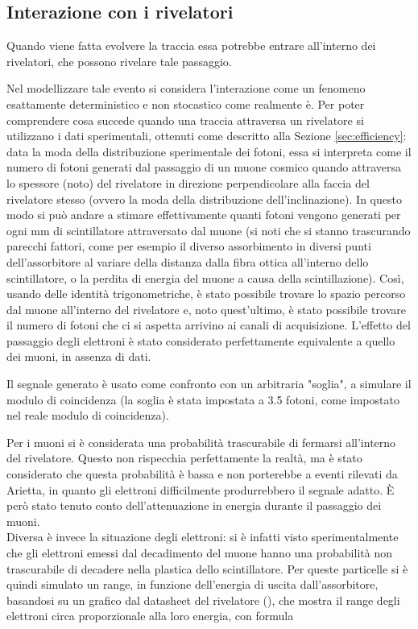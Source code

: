 \subsection{Interazione con i rivelatori}
Quando viene fatta evolvere la traccia essa potrebbe entrare all'interno dei rivelatori, che possono rivelare tale passaggio. 

Nel modellizzare tale evento si considera l'interazione come un fenomeno esattamente deterministico e non stocastico come realmente è. 
Per poter comprendere cosa succede quando una traccia attraversa un rivelatore si utilizzano i dati sperimentali, ottenuti come descritto alla Sezione \ref{sec:efficiency}: data la moda della distribuzione sperimentale dei fotoni, essa si interpreta come il numero di fotoni generati dal passaggio di un muone cosmico quando attraversa lo spessore (noto) del rivelatore in direzione perpendicolare alla faccia del rivelatore stesso (ovvero la moda della distribuzione dell'inclinazione). 
In questo modo si può andare a stimare effettivamente quanti fotoni vengono generati per ogni mm di scintillatore attraversato dal muone (si noti che si stanno trascurando parecchi fattori, come per esempio il diverso assorbimento in diversi punti dell'assorbitore al variare della distanza dalla fibra ottica all'interno dello scintillatore, o la perdita di energia del muone a causa della scintillazione). 
Così, usando delle identità trigonometriche, è stato possibile trovare lo spazio percorso dal muone all'interno del rivelatore e, noto quest'ultimo, è stato possibile trovare il numero di fotoni che ci si aspetta arrivino ai canali di acquisizione. 
L'effetto del passaggio degli elettroni \`e stato considerato perfettamente equivalente a quello dei muoni, in assenza di dati.

Il segnale generato \`e usato come confronto con un arbitraria "soglia", a simulare il modulo di coincidenza (la soglia \`e stata impostata a 3.5 fotoni, come impostato nel reale modulo di coincidenza).

Per i muoni si \`e considerata una probabilit\`a trascurabile di fermarsi all'interno del rivelatore. Questo non rispecchia perfettamente la realt\`a, ma \`e stato considerato che questa probabilit\`a \`e bassa e  non porterebbe a eventi rilevati da Arietta, in quanto gli elettroni difficilmente produrrebbero il segnale adatto. \`E per\`o stato tenuto conto dell'attenuazione in energia durante il passaggio dei muoni.\\

Diversa \`e invece la situazione degli elettroni: si \`e infatti visto sperimentalmente che gli elettroni emessi dal decadimento del muone hanno una probabilit\`a non trascurabile di decadere nella plastica dello scintillatore. Per queste particelle si \`e quindi simulato un range, in funzione dell'energia di uscita dall'assorbitore, basandosi su un grafico dal datasheet del rivelatore (\cite{bib:SiPM}), che mostra il range degli elettroni circa proporzionale alla loro energia, con formula

